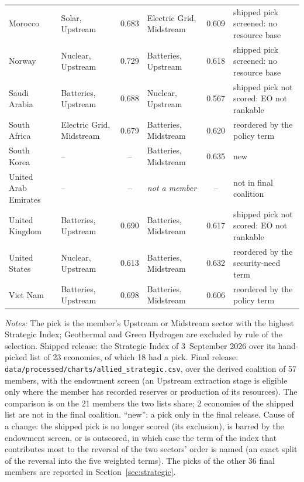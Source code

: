 \begin{table}[htbp]
\begin{threeparttable}
\begin{tabularx}{\textwidth}{@{}l >{\raggedright\arraybackslash}p{1.15in} c >{\raggedright\arraybackslash}p{1.15in} c >{\raggedright\arraybackslash}X@{}}
    Morocco & Solar, Upstream & 0.683 & Electric Grid, Midstream & 0.609 & shipped pick screened: no resource base \\
    Norway & Nuclear, Upstream & 0.729 & Batteries, Upstream & 0.618 & shipped pick screened: no resource base \\
    Saudi Arabia & Batteries, Upstream & 0.688 & Nuclear, Upstream & 0.567 & shipped pick not scored: EO not rankable \\
    South Africa & Electric Grid, Midstream & 0.679 & Batteries, Midstream & 0.620 & reordered by the policy term \\
    South Korea & -- & -- & Batteries, Midstream & 0.635 & new \\
    United Arab Emirates & -- & -- & \emph{not a member} & -- & not in final coalition \\
    United Kingdom & Batteries, Upstream & 0.690 & Batteries, Midstream & 0.617 & shipped pick not scored: EO not rankable \\
    United States & Nuclear, Upstream & 0.613 & Batteries, Midstream & 0.632 & reordered by the security-need term \\
    Viet Nam & Batteries, Upstream & 0.698 & Batteries, Midstream & 0.606 & reordered by the policy term \\
    \bottomrule
  \end{tabularx}
  \begin{tablenotes}[flushleft]\footnotesize
    \item \emph{Notes:} The pick is the member's Upstream or Midstream sector with the highest Strategic Index; Geothermal and Green Hydrogen are excluded by rule of the selection. Shipped release: the Strategic Index of 3~September 2026 over its hand-picked list of 23 economies, of which 18 had a pick. Final release: \texttt{data/processed/charts/allied\_strategic.csv}, over the derived coalition of 57 members, with the endowment screen (an Upstream extraction stage is eligible only where the member has recorded reserves or production of its resources). The comparison is on the 21 members the two lists share; 2 economies of the shipped list are not in the final coalition. ``new'': a pick only in the final release. Cause of a change: the shipped pick is no longer scored (its exclusion), is barred by the endowment screen, or is outscored, in which case the term of the index that contributes most to the reversal of the two sectors' order is named (an exact split of the reversal into the five weighted terms). The picks of the other 36 final members are reported in Section~\ref{sec:strategic}.
  \end{tablenotes}
  \end{threeparttable}
\end{table}
